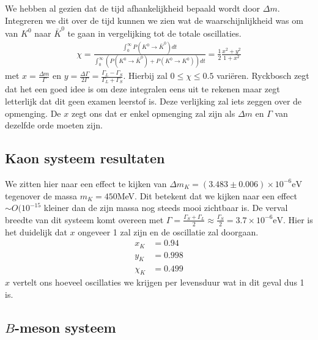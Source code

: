 \documentclass[../main.tex]{subfiles}
\begin{document}
We hebben al gezien dat de tijd afhankelijkheid bepaald wordt door $\Delta m$. Integreren we dit over de tijd kunnen we zien wat de waarschijnlijkheid was om van $K^0$ naar $\bar{K}^0$ te gaan in vergelijking tot de totale oscillaties.
\begin{equation}
    \begin{aligned}
        \label{eq:kaon_osc_tijd_int}
        \chi=\frac{\int_{0}^{\infty} P\left(K^{0} \rightarrow \bar{K}^{0}\right) d t}{\int_{0}^{\infty}\left(P\left(K^{0} \rightarrow \bar{K}^{0}\right)+P\left(K^{0} \rightarrow K^{0}\right)\right) d t}=\frac{1}{2} \frac{x^{2}+y^{2}}{1+x^{2}}
    \end{aligned}
\end{equation}
met $x= \frac{\Delta m}{\Gamma}$ en $y= \frac{\Delta \Gamma}{2\Gamma} = \frac{\Gamma_L-\Gamma_S}{\Gamma_L + \Gamma_S}$. Hierbij zal $0\leq \chi \leq 0.5$ variëren. {\color{blue} Ryckbosch zegt dat het een goed idee is om deze integralen eens uit te rekenen maar zegt letterlijk dat dit geen examen leerstof is.} Deze verlijking zal iets zeggen over de opmenging. De $x$ zegt ons dat er enkel opmenging zal zijn als $\Delta m$ en $\Gamma$ van dezelfde orde moeten zijn.

\subsection{Kaon systeem resultaten}%
\label{sub:kaon_systeem_resultaten}

We zitten hier naar een effect te kijken van $\Delta m_K = (3.483 \pm 0.006) \times 10^{-6} \text{eV}$ tegenover de massa $m_K = 450$MeV. Dit betekent dat we kijken naar een effect $\sim O(10^{-15}$ kleiner dan de zijn massa nog steeds mooi zichtbaar is. De verval breedte van dit systeem komt overeen met $\Gamma=\frac{\Gamma_{S}+\Gamma_{L}}{2} \approx \frac{\Gamma_{S}}{2}=3.7 \times 10^{-6} \text{eV}$. Hier is het duidelijk dat $x$ ongeveer 1 zal zijn en de oscillatie zal doorgaan.
\begin{equation}
    \begin{aligned}
        \label{eq:kaon_osc_exp_results}
        x_{K} &=0.94 \\
        y_{K} &=0.998 \\
        \chi_{K} &=0.499
    \end{aligned}
\end{equation}
$x$ vertelt ons hoeveel oscillaties we krijgen per levensduur wat in dit geval dus 1 is.

\subsection{$B$-meson systeem}%
\label{sub:_b_meson_systeem}
\end{document}

